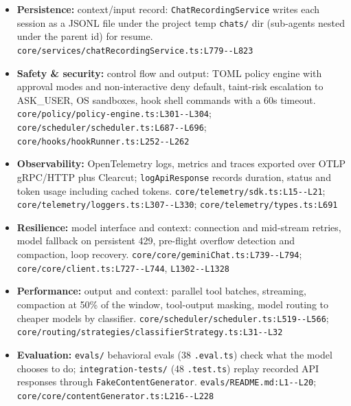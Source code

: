 \begin{itemize}
\item \textbf{Persistence:} context/input record: \texttt{ChatRecordingService} writes each session as a JSONL file under the project temp \texttt{chats/\allowbreak{}} dir (sub-agents nested under the parent id) for resume. \texttt{core/\allowbreak{}services/\allowbreak{}chatRecordingService.\allowbreak{}ts:\allowbreak{}L779-\allowbreak{}-\allowbreak{}L823}
\item \textbf{Safety \& security:} control flow and output: TOML policy engine with approval modes and non-interactive deny default, taint-risk escalation to ASK\_USER, OS sandboxes, hook shell commands with a 60s timeout. \texttt{core/\allowbreak{}policy/\allowbreak{}policy-\allowbreak{}engine.\allowbreak{}ts:\allowbreak{}L301-\allowbreak{}-\allowbreak{}L304}; \texttt{core/\allowbreak{}scheduler/\allowbreak{}scheduler.\allowbreak{}ts:\allowbreak{}L687-\allowbreak{}-\allowbreak{}L696}; \texttt{core/\allowbreak{}hooks/\allowbreak{}hookRunner.\allowbreak{}ts:\allowbreak{}L252-\allowbreak{}-\allowbreak{}L262}
\item \textbf{Observability:} OpenTelemetry logs, metrics and traces exported over OTLP gRPC/HTTP plus Clearcut; \texttt{logApiResponse} records duration, status and token usage including cached tokens. \texttt{core/\allowbreak{}telemetry/\allowbreak{}sdk.\allowbreak{}ts:\allowbreak{}L15-\allowbreak{}-\allowbreak{}L21}; \texttt{core/\allowbreak{}telemetry/\allowbreak{}loggers.\allowbreak{}ts:\allowbreak{}L307-\allowbreak{}-\allowbreak{}L330}; \texttt{core/\allowbreak{}telemetry/\allowbreak{}types.\allowbreak{}ts:\allowbreak{}L691}
\item \textbf{Resilience:} model interface and context: connection and mid-stream retries, model fallback on persistent 429, pre-flight overflow detection and compaction, loop recovery. \texttt{core/\allowbreak{}core/\allowbreak{}geminiChat.\allowbreak{}ts:\allowbreak{}L739-\allowbreak{}-\allowbreak{}L794}; \texttt{core/\allowbreak{}core/\allowbreak{}client.\allowbreak{}ts:\allowbreak{}L727-\allowbreak{}-\allowbreak{}L744}, \texttt{L1302-\allowbreak{}-\allowbreak{}L1328}
\item \textbf{Performance:} output and context: parallel tool batches, streaming, compaction at 50\% of the window, tool-output masking, model routing to cheaper models by classifier. \texttt{core/\allowbreak{}scheduler/\allowbreak{}scheduler.\allowbreak{}ts:\allowbreak{}L519-\allowbreak{}-\allowbreak{}L566}; \texttt{core/\allowbreak{}routing/\allowbreak{}strategies/\allowbreak{}classifierStrategy.\allowbreak{}ts:\allowbreak{}L31-\allowbreak{}-\allowbreak{}L32}
\item \textbf{Evaluation:} \texttt{evals/\allowbreak{}} behavioral evals (38 \texttt{.\allowbreak{}eval.\allowbreak{}ts}) check what the model chooses to do; \texttt{integration-\allowbreak{}tests/\allowbreak{}} (48 \texttt{.\allowbreak{}test.\allowbreak{}ts}) replay recorded API responses through \texttt{FakeContentGenerator}. \texttt{evals/\allowbreak{}README.\allowbreak{}md:\allowbreak{}L1-\allowbreak{}-\allowbreak{}L20}; \texttt{core/\allowbreak{}core/\allowbreak{}contentGenerator.\allowbreak{}ts:\allowbreak{}L216-\allowbreak{}-\allowbreak{}L228}
\end{itemize}
